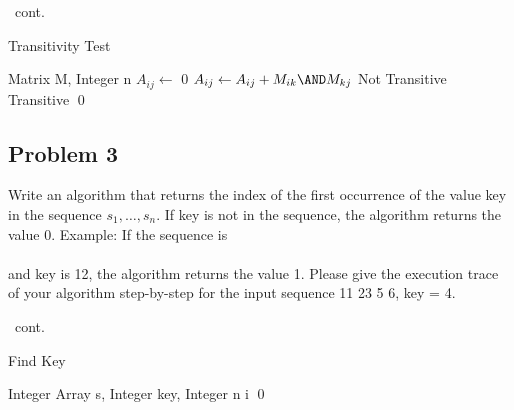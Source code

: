 \documentclass[
               handout,
               ]{beamer}
\begin{document}
        \begin{frame}[c,shrink]{\subsecname\ cont.}          
            \begin{algorithm}[H]
                \caption {Transitivity Test}
                \label{alg1}
                \begin{algorithmic}[1]
                    \REQUIRE Matrix M, Integer n
                    \STATE $A_{ij} \leftarrow$ 0
                    \STATE $A_{ij} \leftarrow A_{ij} + M_{ik} \AND M_{kj}$
                    \ENDFOR
                    \PRINT Not Transitive
                    \RETURN
                    \ENDIF
                    \ENDFOR
                    \ENDFOR
                    \PRINT Transitive \qed
                \end{algorithmic}
            \end{algorithm}        
        \end{frame}



    \subsection{Problem 3}
    
        \begin{frame}[c]{\subsecname}
            Write an algorithm that returns the index of the first occurrence of the value key in the sequence $s_1,\ldots,s_n$. If key is not in the sequence, the algorithm returns the value 0. Example: If the sequence is \\ \\and key is 12, the algorithm returns the value 1. Please give the execution trace of your algorithm step-by-step for the input sequence 11 23 5 6, key = 4.
        \end{frame}
        
        \begin{frame}[c,shrink]{\subsecname\ cont.}          
            \begin{algorithm}[H]
                \caption {Find Key}
                \label{alg2}
                \begin{algorithmic}[1]
                    \REQUIRE Integer Array s, Integer key, Integer n
                    \RETURN i
                    \ENDIF
                    \ENDFOR
                     \qed
                \end{algorithmic}                
            \end{algorithm}        
        \end{frame}
        
\end{document}
